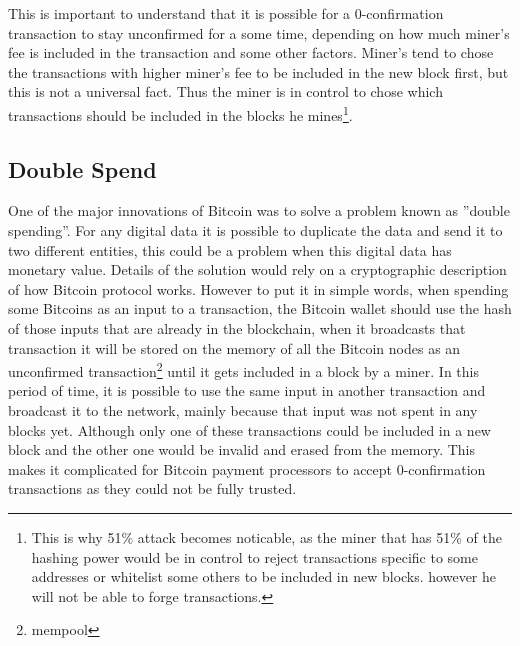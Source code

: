 This is important to understand that it is possible for a 0-confirmation transaction to stay unconfirmed for a some time, depending on how much miner's fee is included in the transaction and some other factors. Miner's tend to chose the transactions with higher miner's fee to be included in the new block first, but this is not a universal fact. Thus the miner is in control to chose which transactions should be included in the blocks he mines\footnote{This is why 51\% attack becomes noticable, as the miner that has 51\% of the hashing power would be in control to reject transactions specific to some addresses or whitelist some others to be included in new blocks. however he will not be able to forge transactions.}.

\subsection{Double Spend}
One of the major innovations of Bitcoin was to solve a problem known as ''double spending''. For any digital data it is possible to duplicate the data and send it to two different entities, this could be a problem when this digital data has monetary value. Details of the solution would rely on a cryptographic description of how Bitcoin protocol works. However to put it in simple words, when spending some Bitcoins as an input to a transaction, the Bitcoin wallet should use the hash of those inputs that are already in the blockchain, when it broadcasts that transaction it will be stored on the memory of all the Bitcoin nodes as an unconfirmed transaction\footnote{mempool} until it gets included in a block by a miner. In this period of time, it is possible to use the same input in another transaction and broadcast it to the network, mainly because that input was not spent in any blocks yet. Although only one of these transactions could be included in a new block and the other one would be invalid and erased from the memory. This makes it complicated for Bitcoin payment processors to accept 0-confirmation transactions as they could not be fully trusted. 



